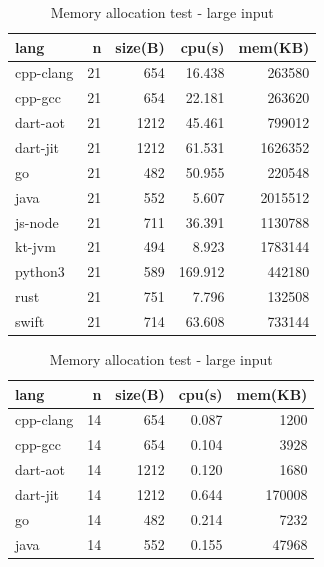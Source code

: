 \begin{table}[htbp]
    \centering
    \caption{Memory allocation test}
    \label{tab:binary-trees}
    \begin{subtable}[h]{0.495\linewidth}
        \centering
        \begin{tabular}{lrrrr}
            \toprule
            lang      & n  & size(B) & cpu(s)  & mem(KB) \\
            \midrule
            cpp-clang & 21 & 654     & 16.438  & 263580  \\
            cpp-gcc   & 21 & 654     & 22.181  & 263620  \\
            dart-aot  & 21 & 1212    & 45.461  & 799012  \\
            dart-jit  & 21 & 1212    & 61.531  & 1626352 \\
            go        & 21 & 482     & 50.955  & 220548  \\
            java      & 21 & 552     & 5.607   & 2015512 \\
            js-node   & 21 & 711     & 36.391  & 1130788 \\
            kt-jvm    & 21 & 494     & 8.923   & 1783144 \\
            python3   & 21 & 589     & 169.912 & 442180  \\
            rust      & 21 & 751     & 7.796   & 132508  \\
            swift     & 21 & 714     & 63.608  & 733144  \\
            \bottomrule
        \end{tabular}
        \caption{Memory allocation test - large input}
        \label{tab:binary-trees-1}
    \end{subtable}
    \begin{subtable}[h]{0.495\linewidth}
        \centering
        \begin{tabular}{lrrrr}
            \toprule
            lang      & n  & size(B) & cpu(s) & mem(KB) \\
            \midrule
            cpp-clang & 14 & 654     & 0.087  & 1200    \\
            cpp-gcc   & 14 & 654     & 0.104  & 3928    \\
            dart-aot  & 14 & 1212    & 0.120  & 1680    \\
            dart-jit  & 14 & 1212    & 0.644  & 170008  \\
            go        & 14 & 482     & 0.214  & 7232    \\
            java      & 14 & 552     & 0.155  & 47968   \\

\end{tabular}
\end{subtable}
\end{table}
